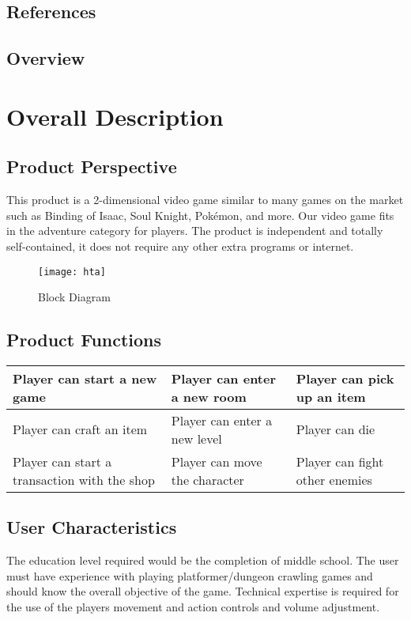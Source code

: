 \documentclass[12pt, titlepage]{article}
\begin{document}
  \subsection{References}
  \subsection{Overview}

\section{Overall Description}

  \subsection{Product Perspective}
  This product is a 2-dimensional video game similar to many games on the market such as Binding of Isaac, Soul Knight, Pokémon, and more. Our video game fits in the adventure category for players. The product is independent and totally self-contained, it does not require any other extra programs or internet.
  
   \begin{figure}[htp]
	\centering
	\texttt{[image: hta]}
	\caption{Block Diagram}
	\label{fig:block}
   \end{figure}

  
  \subsection{Product Functions}
   \begin{center}
    \begin{tabular}{ | m{5em} | m{5em}| m{5em} | } 
    \hline
    Player can start a new game & Player can enter a new room & Player can pick up an item \\ 
    \hline
    Player can craft an item & Player can enter a new level & Player can die \\ 
    \hline
    Player can start a transaction with the shop & Player can move the character & Player can fight other enemies \\ 
    \hline
    \end{tabular}
    \end{center}
  \subsection{User Characteristics}
  The education level required would be the completion of middle school. The user must have experience with playing platformer/dungeon crawling games and should know the overall objective of the game. Technical expertise is required for the use of the players movement and action controls and volume adjustment.
\end{document}
